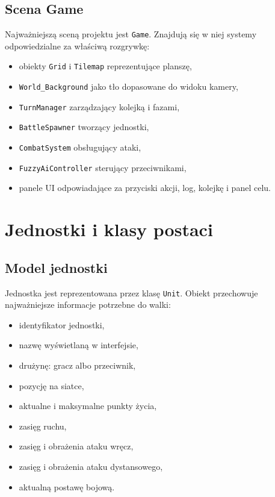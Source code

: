 \documentclass[12pt,a4paper]{article}
\begin{document}
\subsection{Scena Game}

Najważniejszą sceną projektu jest \texttt{Game}. Znajdują się w niej systemy odpowiedzialne za właściwą rozgrywkę:

\begin{itemize}
    \item obiekty \texttt{Grid} i \texttt{Tilemap} reprezentujące planszę,
    \item \texttt{World\_Background} jako tło dopasowane do widoku kamery,
    \item \texttt{TurnManager} zarządzający kolejką i fazami,
    \item \texttt{BattleSpawner} tworzący jednostki,
    \item \texttt{CombatSystem} obsługujący ataki,
    \item \texttt{FuzzyAiController} sterujący przeciwnikami,
    \item panele UI odpowiadające za przyciski akcji, log, kolejkę i panel celu.
\end{itemize}

\newpage

\section{Jednostki i klasy postaci}

\subsection{Model jednostki}

Jednostka jest reprezentowana przez klasę \texttt{Unit}. Obiekt przechowuje najważniejsze informacje potrzebne do walki:

\begin{itemize}
    \item identyfikator jednostki,
    \item nazwę wyświetlaną w interfejsie,
    \item drużynę: gracz albo przeciwnik,
    \item pozycję na siatce,
    \item aktualne i maksymalne punkty życia,
    \item zasięg ruchu,
    \item zasięg i obrażenia ataku wręcz,
    \item zasięg i obrażenia ataku dystansowego,
    \item aktualną postawę bojową.
\end{itemize}
\end{document}
